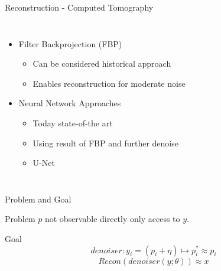 \begin{frame}{Reconstruction -  Computed Tomography}
    \begin{columns}
        
        \begin{itemize}
            \item Filter Backprojection (FBP)
            \begin{itemize}
                \item Can be considered historical approach
                \item Enables reconstruction for moderate noise
            \end{itemize}
            \item<3> Neural Network Approaches
            \begin{itemize}
                \item Today state-of-the art
                \item Using result of FBP and further denoise
                \item U-Net \cite{unet-tomography}
            \end{itemize}
        \end{itemize}


    \end{columns}
\end{frame}



\begin{frame}{Problem and Goal}
    \pause
    \begin{block}{Problem}
        $p$ not observable directly only access to $y$.
    \end{block}
    \pause
    \begin{block}{Goal}
        $$ denoiser:   y_i = (p_i + \eta) \mapsto p_i^* \approx p_i $$
        $$ \textit{Recon} \left( denoiser(y; \theta) \right) \approx x $$
    \end{block}

\end{frame}


